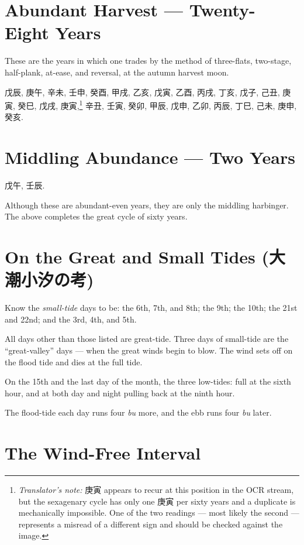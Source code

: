 \documentclass[10pt, openany]{book}
\newcommand{\jp}[1]{{\japanesefont #1}}
\newcommand{\tn}[1]{\footnote{\textit{Translator's note:} #1}}
\begin{document}
\section{Abundant Harvest --- Twenty-Eight Years}

These are the years in which one trades by the method of
three-flats, two-stage, half-plank, at-ease, and reversal, at the
autumn harvest moon.

\jp{戊辰}, \jp{庚午}, \jp{辛未}, \jp{壬申}, \jp{癸酉}, \jp{甲戌},
\jp{乙亥}, \jp{戊寅}, \jp{乙酉}, \jp{丙戌}, \jp{丁亥}, \jp{戊子},
\jp{己丑}, \jp{庚寅}, \jp{癸巳}, \jp{戊戌}, \jp{庚寅},\tn{\jp{庚寅}
appears to recur at this position in the OCR stream, but the
sexagenary cycle has only one \jp{庚寅} per sixty years and a
duplicate is mechanically impossible. One of the two readings ---
most likely the second --- represents a misread of a different
sign and should be checked against the image.} \jp{辛丑},
\jp{壬寅}, \jp{癸卯}, \jp{甲辰}, \jp{戊申}, \jp{乙卯}, \jp{丙辰},
\jp{丁巳}, \jp{己未}, \jp{庚申}, \jp{癸亥}.

\section{Middling Abundance --- Two Years}

\jp{戊午}, \jp{壬辰}.

Although these are abundant-even years, they are only the middling
harbinger. The above completes the great cycle of sixty years.

\section{On the Great and Small Tides (\jp{大潮小汐の考})}

Know the \textit{small-tide} days to be: the 6th, 7th, and 8th;
the 9th; the 10th; the 21st and 22nd; and the 3rd, 4th, and 5th.

All days other than those listed are great-tide. Three days of
small-tide are the ``great-valley'' days --- when the great winds
begin to blow. The wind sets off on the flood tide and dies at the
full tide.

On the 15th and the last day of the month, the three low-tides:
full at the sixth hour, and at both day and night pulling back at
the ninth hour.

The flood-tide each day runs four \textit{bu} more, and the ebb
runs four \textit{bu} later.

\section{The Wind-Free Interval}
\end{document}
